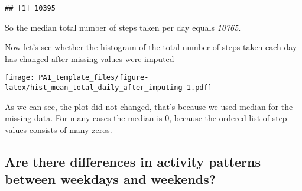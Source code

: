 \documentclass[
]{article}
\newenvironment{Shaded}{\begin{snugshade}}{\end{snugshade}}
\newcommand{\AttributeTok}[1]{\textcolor[rgb]{0.13,0.29,0.53}{#1}}
\newcommand{\ConstantTok}[1]{\textcolor[rgb]{0.56,0.35,0.01}{#1}}
\newcommand{\FunctionTok}[1]{\textcolor[rgb]{0.13,0.29,0.53}{\textbf{#1}}}
\newcommand{\NormalTok}[1]{#1}
\newcommand{\SpecialCharTok}[1]{\textcolor[rgb]{0.81,0.36,0.00}{\textbf{#1}}}
\newcommand{\StringTok}[1]{\textcolor[rgb]{0.31,0.60,0.02}{#1}}
\begin{document}
\begin{Shaded}
\end{Shaded}

\begin{verbatim}
## [1] 10395
\end{verbatim}

So the median total number of steps taken per day equals \emph{10765}.

Now let's see whether the histogram of the total number of steps taken
each day has changed after missing values were imputed

\begin{Shaded}
\end{Shaded}

\texttt{[image: PA1\_template\_files/figure-latex/hist\_mean\_total\_daily\_after\_imputing-1.pdf]}

As we can see, the plot did not changed, that's because we used median
for the missing data. For many cases the median is 0, because the
ordered list of step values consists of many zeros.

\subsection{Are there differences in activity patterns between weekdays
and
weekends?}\label{are-there-differences-in-activity-patterns-between-weekdays-and-weekends}
\end{document}
